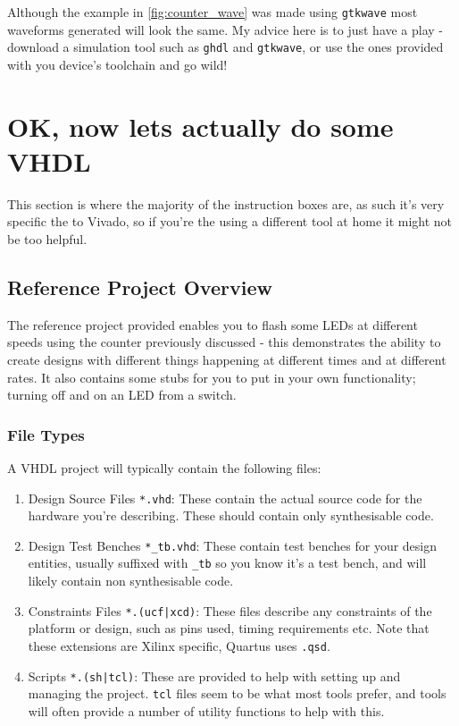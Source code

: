 \documentclass[11pt,a4paper]{article}
\begin{document}
Although the example in \cref{fig:counter_wave} was made using \texttt{gtkwave} most waveforms generated will look the same. My advice here is to just have a play - download a simulation tool such as \texttt{ghdl} and \texttt{gtkwave}, or use the ones provided with you device's toolchain and go wild!

\section{OK, now lets actually do some VHDL}\label{section:vhdl}

This section is where the majority of the instruction boxes are, as such it's very specific the to Vivado, so if you're the using a different tool at home it might not be too helpful.

\subsection{Reference Project Overview}
The reference project provided enables you to flash some LEDs at different speeds using the counter previously discussed - this demonstrates the ability to create designs with different things happening at different times and at different rates. It also contains some stubs for you to put in your own functionality; turning off and on an LED from a switch. 

\subsubsection{File Types}
A VHDL project will typically contain the following files:
\begin{enumerate}
    \item Design Source Files \texttt{*.vhd}: These contain the actual source code for the hardware you're describing. These should contain only synthesisable code.
    \item Design Test Benches \texttt{*\_tb.vhd}: These contain test benches for your design entities, usually suffixed with \texttt{\_tb} so you know it's a test bench, and will likely contain non synthesisable code.
    \item Constraints Files \texttt{*.(ucf|xcd)}: These files describe any constraints of the platform or design, such as pins used, timing requirements etc. Note that these extensions are Xilinx specific, Quartus uses \texttt{.qsd}.
    \item Scripts \texttt{*.(sh|tcl)}: These are provided to help with setting up and managing the project. \texttt{tcl} files seem to be what most tools prefer, and tools will often provide a number of utility functions to help with this. 
\end{enumerate}
\end{document}
